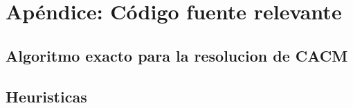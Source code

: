 \section{Ap\'endice: C\'odigo fuente relevante}


\subsection{Algoritmo exacto para la resolucion de CACM}


\subsection{Heuristicas}

